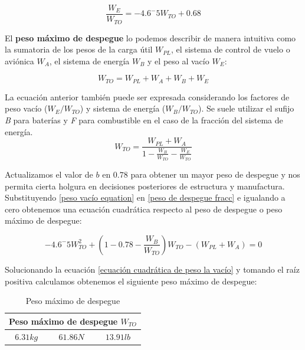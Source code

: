 \begin{equation}
\label{peso vacío equation}
    \frac{W_E}{W_{TO}}= -4.6^-5 W_{TO} + 0.68
\end{equation}

El \textbf{peso máximo de despegue} lo podemos describir de manera intuitiva como la sumatoria de los pesos de la carga útil $W_{PL}$, el sistema de control de vuelo o aviónica $W_{A}$, el sistema de energía $W_{B}$ y el peso al vacío $W_{E}$:

\begin{equation}
    W_{TO} = W_{PL} + W_{A} + W_{B} + W_{E}
\end{equation}

La ecuación anterior también puede ser expresada considerando los factores de peso vacío ($W_E/W_{TO}$) y sistema de energía ($W_B/W_{TO}$). Se suele utilizar el sufijo \textit{B} para baterías y \textit{F} para combustible en el caso de la fracción del sistema de energía. 
\begin{equation}
\label{peso de despegue fracc}
    W_{TO} = \frac{W_{PL}+W_{A}}{1-\frac{W_B}{W_{TO}}-\frac{W_E}{W_{TO}}}
\end{equation}

Actualizamos el valor de $b$ en $0.78$ para obtener un mayor peso de despegue y nos permita cierta holgura en decisiones posteriores de estructura y manufactura. Substituyendo \ref{peso vacío equation} en \ref{peso de despegue fracc} e igualando a cero obtenemos una ecuación cuadrática respecto al peso de despegue o peso máximo de despegue:

\begin{equation}
\label{ecuación cuadrática de peso la vacío}
    -4.6^-5 W_{TO}^2 + (1-0.78-\frac{W_B}{W_{TO}})W_{TO} - (W_{PL}+W_{A})=0
\end{equation}

 
Solucionando la ecuación \ref{ecuación cuadrática de peso la vacío} y tomando el raíz positiva calculamos obtenemos el siguiente peso máximo de despegue:

\begin{table}[h]
    \centering
    \begin{tabular}{|c|c|c|}
    \hline
     \multicolumn{3}{|c|}{Peso máximo de despegue $W_{TO}$} \\
     \hline
    $6.31 kg$ & $61.86 N$ & $13.91 lb$ \\
     \hline
    \end{tabular}
    \caption{Peso máximo de despegue}
    \label{peso maximo de despegue}
\end{table}

